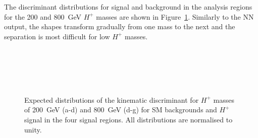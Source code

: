 The discriminant distributions for signal and background in the analysis regions for the 200 and 800~GeV $H^+$ masses are shown in Figure~\ref{Hplustb:Discriminantshapes}. Similarly to the NN output, the shapes transform gradually from one mass to the next and the separation is most difficult for low $H^+$ masses.

\begin{figure}[htb]
    \RawFloats
    \centering
     \\
     \\
     \\
     \\
    \caption{Expected distributions of the kinematic discriminant for $H^+$ masses of 200~GeV (a-d)
    and 800~GeV (d-g) for SM backgrounds and $H^+$ signal in the four signal regions.
    All distributions are normalised to unity.
    }
    \label{Hplustb:Discriminantshapes}
\end{figure}
\clearpage